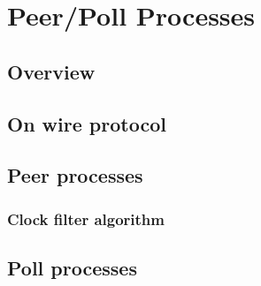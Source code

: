 \chapter{Peer/Poll Processes}
\label{cha:peer/poll}


\section{Overview}%
\label{sec:overview}

\section{On wire protocol}%
\label{sec:on_wire_protocol}

\section{Peer processes}%
\label{sec:peer_processes}

\subsection{Clock filter algorithm}%
\label{sub:clock_filter_algorithm}


\section{Poll processes}%
\label{sec:poll_processes}



